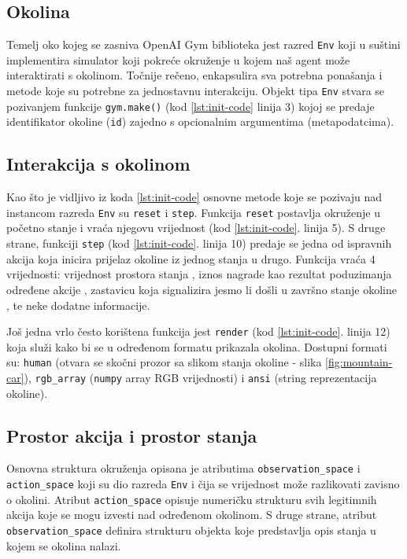 \subsection{Okolina}

Temelj oko kojeg se zasniva OpenAI Gym biblioteka jest razred  \texttt{Env} koji u suštini implementira simulator koji pokreće okruženje u kojem naš agent može interaktirati s okolinom. Točnije rečeno, enkapsulira sva potrebna ponašanja i metode koje su potrebne za jednostavnu interakciju. Objekt tipa \texttt{Env} stvara se pozivanjem funkcije \texttt{gym.make()} (kod \ref{lst:init-code} linija 3) kojoj se predaje identifikator okoline (\texttt{id}) zajedno s opcionalnim argumentima (metapodatcima). 

\subsection{Interakcija s okolinom}

Kao što je vidljivo iz koda \ref{lst:init-code} osnovne metode koje se pozivaju nad instancom razreda \texttt{Env} su \texttt{reset} i \texttt{step}. Funkcija \texttt{reset} postavlja okruženje u početno stanje i vraća njegovu vrijednost (kod \ref{lst:init-code}. linija 5). S druge strane, funkciji \texttt{step} (kod \ref{lst:init-code}. linija 10) predaje se jedna od ispravnih akcija koja inicira prijelaz okoline iz jednog stanja u drugo. Funkcija vraća 4 vrijednosti: vrijednost prostora stanja , iznos nagrade kao rezultat poduzimanja određene akcije  , zastavicu koja signalizira jesmo li došli u završno stanje okoline , te neke dodatne informacije.

Još jedna vrlo često korištena funkcija jest \texttt{render} (kod \ref{lst:init-code}. linija 12) koja služi kako bi se u određenom formatu prikazala okolina. Dostupni formati su: \texttt{human} (otvara se skočni prozor sa slikom stanja okoline - slika \ref{fig:mountain-car}), \texttt{rgb_array} (\texttt{numpy} array RGB vrijednosti) i \texttt{ansi} (string reprezentacija okoline).

\subsection{Prostor akcija i prostor stanja}

Osnovna struktura okruženja opisana je atributima \texttt{observation_space} i \texttt{actio\-n_space} koji su dio razreda \texttt{Env} i čija se vrijednost može razlikovati zavisno o okolini. Atribut \texttt{action_space} opisuje numeričku strukturu svih legitimnih akcija koje se mogu izvesti nad određenom okolinom. S druge strane, atribut \texttt{observation_s\-pace} definira strukturu objekta koje predstavlja opis stanja u kojem se okolina nalazi.

